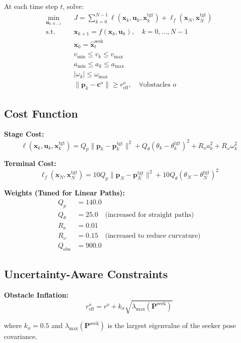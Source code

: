 \documentclass[11pt]{article}
\begin{document}
At each time step $t$, solve:
\begin{align}
\min_{\mathbf{u}_{0:N-1}} \quad & J = \sum_{k=0}^{N-1} \ell(\mathbf{x}_k, \mathbf{u}_k, \mathbf{x}_k^{\text{tgt}}) + \ell_f(\mathbf{x}_N, \mathbf{x}_N^{\text{tgt}}) \\
\text{s.t.} \quad & \mathbf{x}_{k+1} = f(\mathbf{x}_k, \mathbf{u}_k), \quad k = 0, \ldots, N-1 \\
& \mathbf{x}_0 = \hat{\mathbf{x}}_t^{\text{seek}} \\
& v_{\min} \leq v_k \leq v_{\max} \\
& a_{\min} \leq a_k \leq a_{\max} \\
& |\omega_k| \leq \omega_{\max} \\
& \|\mathbf{p}_k - \mathbf{c}^o\| \geq r_{\text{eff}}^o, \quad \forall \text{obstacles } o
\end{align}

\subsection{Cost Function}

\textbf{Stage Cost:}
\[
\ell(\mathbf{x}_k, \mathbf{u}_k, \mathbf{x}_k^{\text{tgt}}) = Q_p \|\mathbf{p}_k - \mathbf{p}_k^{\text{tgt}}\|^2 + Q_\theta (\theta_k - \theta_k^{\text{tgt}})^2 + R_a a_k^2 + R_\omega \omega_k^2
\]

\textbf{Terminal Cost:}
\[
\ell_f(\mathbf{x}_N, \mathbf{x}_N^{\text{tgt}}) = 10 Q_p \|\mathbf{p}_N - \mathbf{p}_N^{\text{tgt}}\|^2 + 10 Q_\theta (\theta_N - \theta_N^{\text{tgt}})^2
\]

\textbf{Weights (Tuned for Linear Paths):}
\begin{align}
Q_p &= 140.0 \\
Q_\theta &= 25.0 \quad \text{(increased for straight paths)} \\
R_a &= 0.01 \\
R_\omega &= 0.15 \quad \text{(increased to reduce curvature)} \\
Q_{\text{obs}} &= 900.0
\end{align}

\subsection{Uncertainty-Aware Constraints}

\textbf{Obstacle Inflation:}
\[
r_{\text{eff}}^o = r^o + k_\sigma \sqrt{\lambda_{\max}(\mathbf{P}^{\text{seek}})}
\]

where $k_\sigma = 0.5$ and $\lambda_{\max}(\mathbf{P}^{\text{seek}})$ is the largest eigenvalue of the seeker pose covariance.
\end{document}
